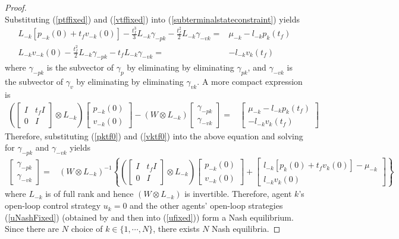 \documentclass[12pt,draftcls,onecolumn]{IEEEtran}  %
\begin{document}
{\begin{proof}
\begin{subequations}
\end{subequations}
Substituting (\ref{ptffixed}) and (\ref{vtffixed}) into (\ref{subterminalstateconstraint}) yields
\begin{align}
L_{-k}[p_{-k}(0)+t_fv_{-k}(0)]-\frac{t_f^3}{3}L_{-k}\gamma_{-pk} -\frac{t_f^2}{2}L_{-k}\gamma_{-vk}=&\mu_{-k}-l_{-k}p_k(t_f)\\
L_{-k}v_{-k}(0)-\frac{t_f^2}{2}L_{-k}\gamma_{-pk} -t_fL_{-k}\gamma_{-vk}=&-l_{-k}v_k(t_f)
\end{align}
where $\gamma_{-pk}$ is the subvector of $\gamma_{p}$ by eliminating by eliminating $\gamma_{pk}$, and $\gamma_{-vk}$ is the subvector of $\gamma_{v}$ by eliminating by eliminating $\gamma_{vk}$. A more compact expression is
\begin{align}
\left(\begin{bmatrix}
I&t_fI\\
0&I
\end{bmatrix}\otimes L_{-k}\right)\begin{bmatrix}
p_{-k}(0)\\
v_{-k}(0)
\end{bmatrix}-
\left(W\otimes L_{-k}\right)\begin{bmatrix}
\gamma_{-pk}\\
\gamma_{-vk}
\end{bmatrix}=&\begin{bmatrix}
\mu_{-k}-l_{-k}p_k(t_f)\\
-l_{-k}v_k(t_f)
\end{bmatrix}
\end{align}
Therefore, substituting (\ref{pktf0}) and (\ref{vktf0}) into the above equation and solving for $\gamma_{-pk}$ and $\gamma_{-vk}$ yields
\begin{align}
\begin{bmatrix}
\gamma_{-pk}\\
\gamma_{-vk}
\end{bmatrix}=&\left(W\otimes L_{-k}\right)^{-1}\left\{\left(\begin{bmatrix}
I&t_fI\\
0&I
\end{bmatrix}\otimes L_{-k}\right)\begin{bmatrix}
p_{-k}(0)\\
v_{-k}(0)
\end{bmatrix}+\begin{bmatrix}
l_{-k}[p_k(0)+t_fv_k(0)]-\mu_{-k}\\
l_{-k}v_k(0)
\end{bmatrix}\right\}\label{gammaminuskfixed}
\end{align}
where $L_{-k}$ is of full rank and hence $(W\otimes L_{-k})$ is invertible. Therefore, agent $k$'s open-loop control strategy $u_k=0$ and the other agents' open-loop strategies (\ref{uNashFixed}) (obtained by and then into (\ref{ufixed})) form a Nash equilibrium. Since there are $N$ choice of $k\in\{1,\cdots,N\}$, there exists $N$ Nash equilibria.
\end{proof}

}
\end{document}
